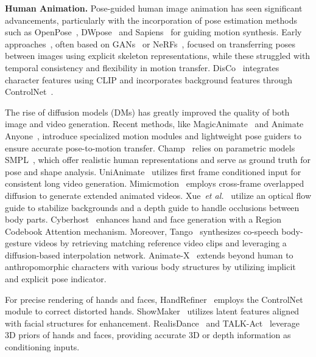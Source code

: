 \noindent\textbf{Human Animation.} Pose-guided human image animation has seen significant advancements, particularly with the incorporation of pose estimation methods such as OpenPose~\cite{cao2017realtime}, DWpose~\cite{yang2023effective} and Sapiens~\cite{khirodkar2024sapiens} for guiding motion synthesis. Early approaches~\cite{liao2020speech2video, weng2022humannerf, ginosar2019learning, ye2023geneface}, often based on GANs~\cite{goodfellow2014generative} or NeRFs~\cite{mildenhall2021nerf}, focused on transferring poses between images using explicit skeleton representations, while these struggled with temporal consistency and flexibility in motion transfer. DisCo~\cite{wang2024disco} integrates character features using CLIP and incorporates background features through ControlNet~\cite{zhang2023adding}.

The rise of diffusion models (DMs) has greatly improved the quality of both image and video generation. Recent methods, like MagicAnimate~\cite{xu2024magicanimate} and Animate Anyone~\cite{hu2024animate}, introduce specialized motion modules and lightweight pose guiders to ensure accurate pose-to-motion transfer. Champ~\cite{zhu2024champ} relies on parametric models SMPL~\cite{loper2023smpl}, which offer realistic human representations and serve as ground truth for pose and shape analysis. UniAnimate~\cite{wang2024unianimate} utilizes first frame conditioned input for consistent long video generation. Mimicmotion~\cite{zhang2024mimicmotion} employs cross-frame overlapped diffusion to generate extended animated videos. Xue~\textit{et al.}~\cite{xue2024follow} utilize an optical flow guide to stabilize backgrounds and a depth guide to handle occlusions between body parts. Cyberhost~\cite{lin2024cyberhost} enhances hand and face generation with a Region Codebook Attention mechanism. Moreover,  Tango~\cite{liu2024tango} synthesizes co-speech body-gesture videos by retrieving matching reference video clips and leveraging a diffusion-based interpolation network. Animate-X~\cite{tan2024animate} extends beyond human to anthropomorphic
characters with various body structures by utilizing implicit and explicit pose indicator.

For precise rendering of hands and faces, HandRefiner~\cite{lu2024handrefiner} employs the ControlNet module to correct distorted hands. ShowMaker~\cite{yangshowmaker} utilizes latent features aligned with facial structures for enhancement. RealisDance~\cite{zhou2024realisdance} and TALK-Act~\cite{guan2024talk} leverage 3D priors of hands and faces, providing accurate 3D or depth information as conditioning inputs.
